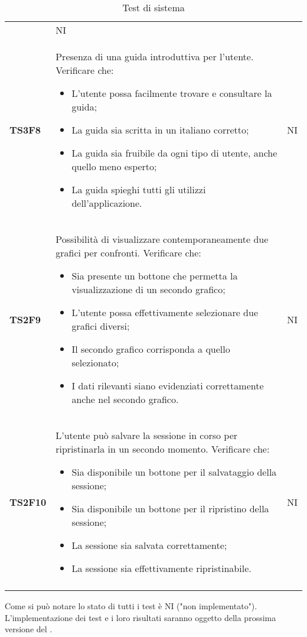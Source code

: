 \begin{longtable}{C{2cm} C{12cm} C{1.5cm}}
			   & NI \\
			   
\textbf{TS3F8} & Presenza di una guida introduttiva per l'utente. Verificare che:
					\begin{itemize}
						\item L'utente possa facilmente trovare e consultare la guida;
						\item La guida sia scritta in un italiano corretto;
						\item La guida sia fruibile da ogni tipo di utente, anche quello meno esperto; 
						\item La guida spieghi tutti gli utilizzi dell'applicazione.
					\end{itemize}
			   & NI \\
\textbf{TS2F9} & Possibilità di visualizzare contemporaneamente due grafici per confronti. Verificare che: 
					\begin{itemize}
						\item Sia presente un bottone che permetta la visualizzazione di un secondo grafico;
						\item L'utente possa effettivamente selezionare due grafici diversi;
						\item Il secondo grafico corrisponda a quello selezionato;
						\item I dati rilevanti siano evidenziati correttamente anche nel secondo grafico.
					\end{itemize}	
			   & NI \\
\textbf{TS2F10} & L'utente può salvare la sessione in corso per ripristinarla in un secondo momento. Verificare che: 
					\begin{itemize}
						\item Sia disponibile un bottone per il salvataggio della sessione; 
						\item Sia disponibile un bottone per il ripristino della sessione;
						\item La sessione sia salvata correttamente;
						\item La sessione sia effettivamente ripristinabile.
					\end{itemize}	
			   & NI \\
			   
			   \caption{Test di sistema}
\label{testSistema}
\end{longtable}
Come si può notare lo stato di tutti i test è NI ("non implementato"). L'implementazione dei test e i loro risultati saranno oggetto della prossima versione del \PdQv{}.

